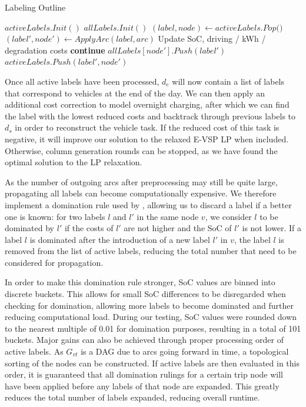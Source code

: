 \documentclass[]{article}
\begin{document}
\begin{algorithm}
\caption{Labeling Outline}\label{alg:evsp-labeling}
\begin{algorithmic}
\State $activeLabels.Init()$ 
\State $allLabels.Init()$ 
    \State $(label, node) \gets \textit{activeLabels.Pop()}$
        \State $(label', node') \gets ApplyArc(label, arc)$ \Comment Update SoC, driving / kWh / degradation costs
          \textbf{continue}
        \EndIf
        \State $allLabels[node'].Push(label')$
          \State $activeLabels.Push(label', node')$
        \EndIf
    \EndFor
\EndWhile
\end{algorithmic}
\end{algorithm}
Once all active labels have been processed, $d_e$ will now contain a list of labels that correspond to vehicles at the end of the day. We can then apply an additional cost correction to model overnight charging, after which we can find the label with the lowest reduced costs and backtrack through previous labels to $d_s$ in order to reconstruct the vehicle task. If the reduced cost of this task is negative, it will improve our solution to the relaxed E-VSP LP when included. Otherwise, column generation rounds can be stopped, as we have found the optimal solution to the LP relaxation. 

As the number of outgoing arcs after preprocessing may still be quite large, propagating all labels can become computationally expensive. We therefore implement a domination rule used by \citet{Huang2016}, allowing us to discard a label if a better one is known: for two labels $l$ and $l'$ in the same node $v$, we consider $l$ to be dominated by $l'$ if the costs of $l'$ are not higher and the SoC of $l'$ is not lower. If a label $l$ is dominated after the introduction of a new label $l'$ in $v$, the label $l$ is removed from the list of active labels, reducing the total number that need to be considered for propagation.

In order to make this domination rule stronger, SoC values are binned into discrete buckets. This allows for small SoC differences to be disregarded when checking for domination, allowing more labels to become dominated and further reducing computational load. During our testing, SoC values were rounded down to the nearest multiple of 0.01 for domination purposes, resulting in a total of 101 buckets. Major gains can also be achieved through proper processing order of active labels. As $G_{vt}$ is a DAG due to arcs going forward in time, a topological sorting of the nodes can be constructed. If active labels are then evaluated in this order, it is guaranteed that all domination rulings for a certain trip node will have been applied before any labels of that node are expanded. This greatly reduces the total number of labels expanded, reducing overall runtime.
\end{document}
